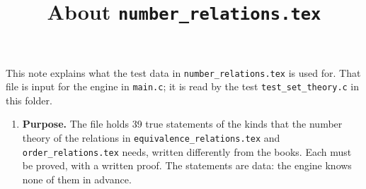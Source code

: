 \documentclass[11pt,a4paper]{article}
\title{About \texttt{number\_relations.tex}}
\author{}
\date{}
\begin{document}
\maketitle
This note explains what the test data in \texttt{number\_relations.tex} is used for. That file is input for the engine in \texttt{main.c}; it is read by the test \texttt{test\_set\_theory.c} in this folder.

\begin{enumerate}
\item \textbf{Purpose.} The file holds 39 true statements of the kinds that the number theory of the relations in \texttt{equivalence\_relations.tex} and \texttt{order\_relations.tex} needs, written differently from the books. Each must be proved, with a written proof. The statements are data: the engine knows none of them in advance.


\end{enumerate}
\end{document}
